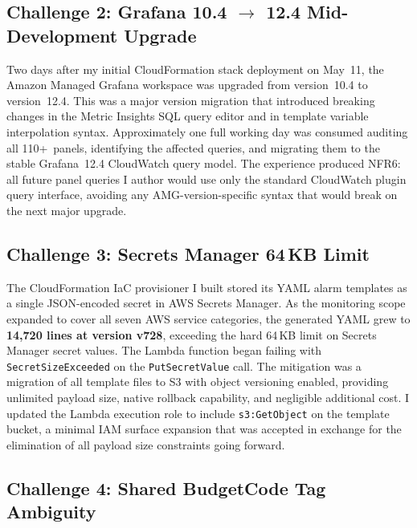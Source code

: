 \subsection{Challenge 2: Grafana 10.4 $\to$ 12.4 Mid-Development Upgrade}

Two days after my initial CloudFormation stack deployment on May~11, the
Amazon Managed Grafana workspace was upgraded from version~10.4 to version~12.4.
This was a major version migration that introduced breaking changes in the
Metric Insights SQL query editor and in template variable interpolation syntax.
Approximately one full working day was consumed auditing all 110+~panels,
identifying the affected queries, and migrating them to the stable Grafana~12.4
CloudWatch query model. The experience produced NFR6: all future panel queries
I author would use only the standard CloudWatch plugin query interface, avoiding any
AMG-version-specific syntax that would break on the next major upgrade.

\subsection{Challenge 3: Secrets Manager 64\,KB Limit}

The CloudFormation IaC provisioner I built stored its YAML alarm templates as a
single JSON-encoded secret in AWS Secrets Manager. As the monitoring scope
expanded to cover all seven AWS service categories, the generated YAML grew to
\textbf{14,720 lines at version v728}, exceeding the hard 64\,KB limit on
Secrets Manager secret values. The Lambda function began failing with
\texttt{SecretSizeExceeded} on the \texttt{PutSecretValue} call. The
mitigation was a migration of all template files to S3 with object versioning
enabled, providing unlimited payload size, native rollback capability, and
negligible additional cost. I updated the Lambda execution role to include
\texttt{s3:GetObject} on the template bucket, a minimal IAM surface expansion
that was accepted in exchange for the elimination of all payload size
constraints going forward.

\subsection{Challenge 4: Shared BudgetCode Tag Ambiguity}

